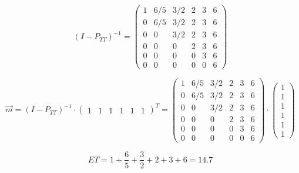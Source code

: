 \documentclass[12pt]{article}
\begin{document}
\begin{enumerate}[label=(\alph*)]
    $$
    (I-P_{TT})^{-1} = \begin{pmatrix}
    1&6/5&3/2&2&3&6\\
    0&6/5&3/2&2&3&6\\
    0&0&3/2&2&3&6\\
    0&0&0&2&3&6\\
    0&0&0&0&3&6\\
    0&0&0&0&0&6
    \end{pmatrix}
    $$
    
    $$
    \vec{m} = (I-P_{TT})^{-1}\cdot \begin{pmatrix}
    1&1&1&1&1&1
    \end{pmatrix}^T
    =
    \begin{pmatrix}
    1&6/5&3/2&2&3&6\\
    0&6/5&3/2&2&3&6\\
    0&0&3/2&2&3&6\\
    0&0&0&2&3&6\\
    0&0&0&0&3&6\\
    0&0&0&0&0&6
    \end{pmatrix}
    \cdot
    \begin{pmatrix}
    1\\1\\1\\1\\1\\1
    \end{pmatrix}
    $$
    
    \vspace{1.5\baselineskip}
    $$ET = 1+\frac{6}{5}+\frac{3}{2}+2+3+6=14.7$$
\end{enumerate}
\end{document}
